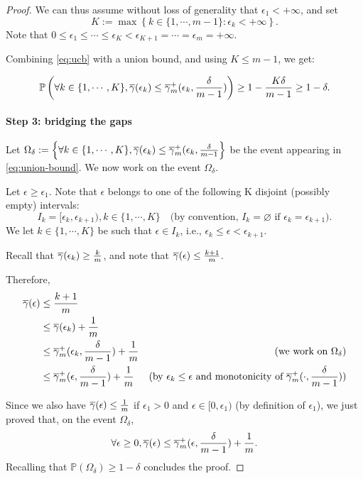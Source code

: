 \begin{proof}
        We can thus assume without loss of generality that $\epsilon_1<+\infty$, and set 
        $$
            K:=\max\left\{k\in\{1,\cdots,m-1\}: \epsilon_k <+\infty\right\}.
        $$
        Note that $0\leq\epsilon_1\leq\cdots\leq\epsilon_K<\epsilon_{K+1}=\cdots=\epsilon_m=+\infty$.

        Combining \eqref{eq:ucb} with a union bound, and using $K\leq m-1$, we get:

        \begin{equation}
            \label{eq:union-bound}
            \mathbb{P}\left(\forall k\in\{1,\cdots,K\}, \overline{\gamma}(\epsilon_k)\leq\overline{\gamma}_{m}^{+}(\epsilon_k, \frac{\delta}{m-1})\right)\geq 1-\frac{K\delta}{m-1}\geq 1-\delta.
        \end{equation}

        \paragraph{Step 3: bridging the gaps}
        
        Let $\Omega_\delta := \left\{ \forall k \in \{1,\cdots,K\}, \overline{\gamma}(\epsilon_k)\leq\overline{\gamma}_{m}^{+}(\epsilon_k, \frac{\delta}{m-1} \right\}$ be the event appearing in \eqref{eq:union-bound}. 
        We now work on the event $\Omega_\delta$.

        Let $\epsilon\geq\epsilon_1$. Note that $\epsilon$ belongs to one of the following K disjoint (possibly empty) intervals:
        $$
            I_k = [\epsilon_k, \epsilon_{k+1}), k\in\{1,\cdots,K\} \quad \text{(by convention, $I_k=\varnothing$ if $\epsilon_k=\epsilon_{k+1}$)}.
        $$
        We let $k\in\{1,\cdots,K\}$ be such that $\epsilon\in I_k$, i.e., $\epsilon_k \leq \epsilon < \epsilon_{k+1}$.

        Recall that $\overline{\gamma}(\epsilon_k)\geq\frac{k}{m}$, and note that $\overline{\gamma}(\epsilon)\leq\frac{k+1}{m}$. 

        Therefore,
        \begin{equation*}
            \begin{aligned}
                \overline{\gamma}(\epsilon) &\leq \frac{k+1}{m}\\
                &\leq \overline{\gamma}(\epsilon_k) + \frac{1}{m}\\
                &\leq \overline{\gamma}_{m}^{+}(\epsilon_k,\frac{\delta}{m-1})+\frac{1}{m} & \text{(we work on $\Omega_\delta$)}\\
                &\leq \overline{\gamma}_{m}^{+}(\epsilon, \frac{\delta}{m-1})+\frac{1}{m} &\text{(by $\epsilon_k \leq \epsilon$ and monotonicity of $\overline{\gamma}_{m}^{+}(\cdot,\frac{\delta}{m-1}))$}
            \end{aligned}
        \end{equation*}

        Since we also have $\overline{\gamma}(\epsilon)\leq\frac{1}{m}$ if $\epsilon_1>0$ and $\epsilon \in [0,\epsilon_1)$ (by definition of $\epsilon_1$), we just proved that, on the event $\Omega_\delta$,
        $$
            \forall \epsilon \geq 0, \overline{\gamma}(\epsilon) \leq \overline{\gamma}_{m}^{+}(\epsilon, \frac{\delta}{m-1})+\frac{1}{m}.
        $$
        Recalling that $\mathbb{P}(\Omega_\delta)\geq 1-\delta$ concludes the proof.
    \end{proof}

